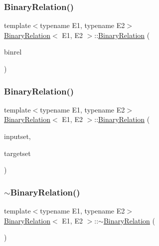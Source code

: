 \subsubsection{\texorpdfstring{Binary\+Relation()}{BinaryRelation()}\hspace{0.1cm}{\footnotesize\ttfamily [2/3]}}
{\footnotesize\ttfamily template$<$typename E1, typename E2$>$ \\
\hyperlink{classBinaryRelation}{Binary\+Relation}$<$ E1, E2 $>$\+::\hyperlink{classBinaryRelation}{Binary\+Relation} (\begin{DoxyParamCaption}\item[{const \hyperlink{classBinaryRelation}{Binary\+Relation}$<$ E1, E2 $>$ \&}]{binrel }\end{DoxyParamCaption})\hspace{0.3cm}{\ttfamily [inline]}}

\mbox{\label{classBinaryRelation_aad68b809d5a88cad7589c1c0c6507307}} 
\subsubsection{\texorpdfstring{Binary\+Relation()}{BinaryRelation()}\hspace{0.1cm}{\footnotesize\ttfamily [3/3]}}
{\footnotesize\ttfamily template$<$typename E1, typename E2$>$ \\
\hyperlink{classBinaryRelation}{Binary\+Relation}$<$ E1, E2 $>$\+::\hyperlink{classBinaryRelation}{Binary\+Relation} (\begin{DoxyParamCaption}\item[{const E1 \&}]{inputset,  }\item[{const E2 \&}]{targetset }\end{DoxyParamCaption})\hspace{0.3cm}{\ttfamily [inline]}}

\mbox{\label{classBinaryRelation_a962cb01ecccb3f3c4ce821925f91ecd6}} 
\subsubsection{\texorpdfstring{$\sim$\+Binary\+Relation()}{~BinaryRelation()}}
{\footnotesize\ttfamily template$<$typename E1, typename E2$>$ \\
\hyperlink{classBinaryRelation}{Binary\+Relation}$<$ E1, E2 $>$\+::$\sim$\hyperlink{classBinaryRelation}{Binary\+Relation} (\begin{DoxyParamCaption}{ }\end{DoxyParamCaption})\hspace{0.3cm}{\ttfamily [inline]}}



